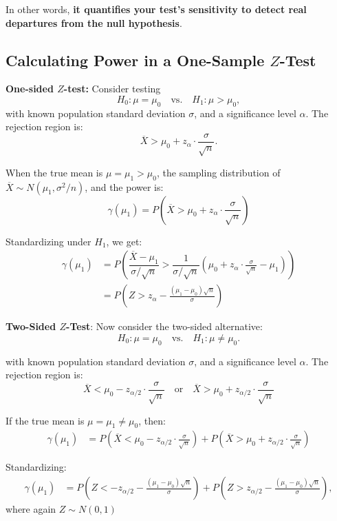 \documentclass[twoside]{book}
\begin{document}
In other words, \textbf{it quantifies your test’s sensitivity to detect real departures from the null hypothesis}.

\subsection{Calculating Power in a One-Sample $Z$-Test}

\noindent\textbf{One-sided $Z$-test:} Consider testing
\[
H_0 : \mu = \mu_0 \quad \text{vs.} \quad H_1 : \mu > \mu_0,
\]
with known population standard deviation \( \sigma \), and a significance level \( \alpha \). The rejection region is:
\[
\overline{X} > \mu_0 + z_\alpha \cdot \frac{\sigma}{\sqrt{n}}.
\]

\noindent When the true mean is \( \mu = \mu_1 > \mu_0 \), the sampling distribution of \( \overline{X} \sim N(\mu_1, \sigma^2 / n) \), and the power is:
\[
\gamma(\mu_1) = P\left( \overline{X} > \mu_0 + z_\alpha \cdot \frac{\sigma}{\sqrt{n}}\right)
\]

\noindent Standardizing under \( H_1 \), we get:
\begin{align*}
\gamma(\mu_1) &=P\left( \dfrac{\overline{X}-\mu_1}{\sigma/\sqrt{n}} > \dfrac{1}{\sigma/\sqrt{n}}\left( \mu_0 + z_\alpha \cdot \frac{\sigma}{\sqrt{n}}-\mu_1\right)  \right) \\
&= P\left( Z > z_\alpha - \frac{(\mu_1 - \mu_0)\sqrt{n}}{\sigma} \right)
\end{align*}

\medskip

\noindent\textbf{Two-Sided $Z$-Test}: Now consider the two-sided alternative:
\[
H_0 : \mu = \mu_0 \quad \text{vs.} \quad H_1 : \mu \ne \mu_0.
\]

with known population standard deviation \( \sigma \), and a significance level \( \alpha \). The rejection region is:
\[
\overline{X} < \mu_0 - z_{\alpha/2} \cdot \frac{\sigma}{\sqrt{n}} \quad \text{or} \quad
\overline{X} > \mu_0 + z_{\alpha/2} \cdot \frac{\sigma}{\sqrt{n}}
\]

If the true mean is \( \mu = \mu_1 \ne \mu_0 \), then:
\begin{align*}
\gamma(\mu_1) &= P\left( \overline{X} < \mu_0 - z_{\alpha/2} \cdot \frac{\sigma}{\sqrt{n}} \right)
+ P\left( \overline{X} > \mu_0 + z_{\alpha/2} \cdot \frac{\sigma}{\sqrt{n}} \right)
\end{align*}

Standardizing:
\begin{align*}
\gamma(\mu_1)
&= P\left( Z < -z_{\alpha/2} - \frac{(\mu_1 - \mu_0)\sqrt{n}}{\sigma} \right)
+ P\left( Z > z_{\alpha/2} - \frac{(\mu_1 - \mu_0)\sqrt{n}}{\sigma} \right),
\end{align*}
where again \( Z \sim N(0,1) \)
\end{document}
